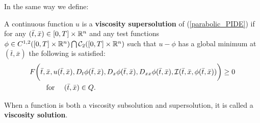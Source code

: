 \noindent
In the same way we define:
\begin{Definition}
 A continuous function $u$ is a \textbf{viscosity supersolution} of (\ref{parabolic_PIDE})
 if for any $(\bar t, \bar x) \in [0,T]\times \mathbb{R}^n$ and any test functions $ \phi \in C^{1,2}([0,T] \times \mathbb{R}^n) \bigcap \mathcal{C}_2([0,T] \times \mathbb{R}^n)$ 
 such that $u-\phi$ has a global minimum at $(\bar t,\bar x)$ the following is satisfied:
\begin{align}\label{supersolution}
 & F\biggl( \bar t,\bar x,u(\bar t,\bar x),D_t \phi(\bar t,\bar x), D_x \phi(\bar t,\bar x),D_{xx}\phi(\bar t,\bar x),\mathcal{I}(\bar t, \bar x,\phi(\bar t,\bar x))\biggr) \geq 0 \\ \nonumber
 &  \quad \quad \mbox{ for } \quad (\bar t,\bar x) \in Q.
\end{align}
\end{Definition}

\noindent
When a function is both a viscosity subsolution and supersolution, it is called a \textbf{viscosity solution}.

% 



